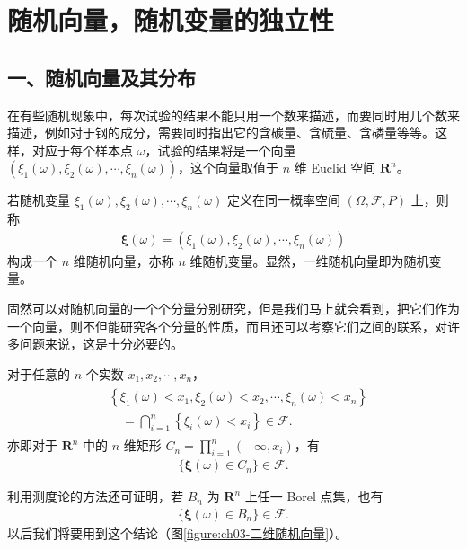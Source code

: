 \documentclass[../../main.tex]{subfiles}
\begin{document}
\section{随机向量，随机变量的独立性}\label{section:ch03-随机向量与独立性}

\subsection*{一、随机向量及其分布}

在有些随机现象中，每次试验的结果不能只用一个数来描述，而要同时用几个数来描述，例如对于钢的成分，需要同时指出它的含碳量、含硫量、含磷量等等。这样，对应于每个样本点 $\omega$，试验的结果将是一个向量 $(\xi_1(\omega),\xi_2(\omega),\cdots,\xi_n(\omega))$，这个向量取值于 $n$ 维 Euclid 空间 $\mathbf{R}^{n}$。

\begin{definition}[随机向量]\label{definition:ch03-随机向量}
若随机变量 $\xi_1(\omega),\xi_2(\omega),\cdots,\xi_n(\omega)$ 定义在同一概率空间 $(\Omega,\mathscr{F},P)$ 上，则称
\begin{align}
\boldsymbol{\xi}(\omega)=(\xi_1(\omega),\xi_2(\omega),\cdots,\xi_n(\omega))\label{align:ch03-随机向量定义}
\end{align}
构成一个 $n$ 维随机向量，亦称 $n$ 维随机变量。显然，一维随机向量即为随机变量。
\end{definition}

固然可以对随机向量的一个个分量分别研究，但是我们马上就会看到，把它们作为一个向量，则不但能研究各个分量的性质，而且还可以考察它们之间的联系，对许多问题来说，这是十分必要的。

对于任意的 $n$ 个实数 $x_1,x_2,\cdots,x_n$，
\begin{align}
\begin{aligned}
&\left\{\xi_1(\omega)<x_1,\xi_2(\omega)<x_2,\cdots,\xi_n(\omega)<x_n\right\}\\
&\quad=\bigcap_{i=1}^{n}\left\{\xi_i(\omega)<x_i\right\}\in\mathscr{F}.
\end{aligned}\label{align:ch03-随机向量可测}
\end{align}
亦即对于 $\mathbf{R}^{n}$ 中的 $n$ 维矩形 $C_n=\prod_{i=1}^{n}(-\infty,x_i)$，有
\begin{align*}\{\boldsymbol{\xi}(\omega)\in C_n\}\in\mathscr{F}.\end{align*}

利用测度论的方法还可证明，若 $B_n$ 为 $\mathbf{R}^{n}$ 上任一 Borel 点集，也有
\begin{align}
\{\boldsymbol{\xi}(\omega)\in B_n\}\in\mathscr{F}.\label{align:ch03-随机向量Borel可测}
\end{align}
以后我们将要用到这个结论（图\ref{figure:ch03-二维随机向量}）。
\end{document}
